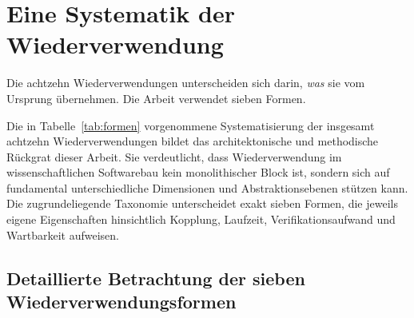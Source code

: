 \documentclass[a4paper,12pt,twoside]{report}
\DeclareRobustCommand{\_}{\textunderscore\allowbreak{}}
\theoremstyle{definition}
\begin{document}
\section{Eine Systematik der Wiederverwendung}
 
Die achtzehn Wiederverwendungen unterscheiden sich darin, \emph{was} sie vom Ursprung übernehmen. Die Arbeit verwendet sieben Formen.

Die in Tabelle~\ref{tab:formen} vorgenommene Systematisierung der insgesamt achtzehn Wiederverwendungen bildet das architektonische und methodische Rückgrat dieser Arbeit. Sie verdeutlicht, dass Wiederverwendung im wissenschaftlichen Softwarebau kein monolithischer Block ist, sondern sich auf fundamental unterschiedliche Dimensionen und Abstraktionsebenen stützen kann. Die zugrundeliegende Taxonomie unterscheidet exakt sieben Formen, die jeweils eigene Eigenschaften hinsichtlich Kopplung, Laufzeit, Verifikationsaufwand und Wartbarkeit aufweisen.

\subsection*{Detaillierte Betrachtung der sieben Wiederverwendungsformen}
\end{document}
